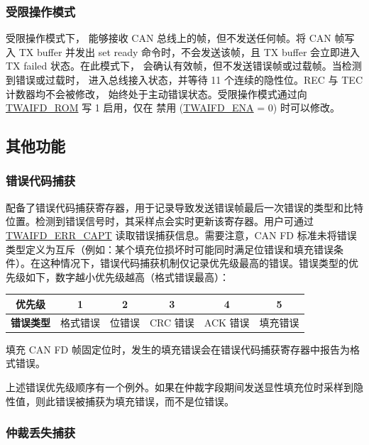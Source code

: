 \documentclass[main\_\_CN.tex]{subfiles}
\begin{document}
\subsubsection{受限操作模式}

受限操作模式下，\modulename{} 能够接收 CAN 总线上的帧，但不发送任何帧。将 CAN 帧写入 TX buffer 并发出 set ready 命令时，不会发送该帧，且 TX buffer 会立即进入 TX failed 状态。在此模式下，\modulename{} 会确认有效帧，但不发送错误帧或过载帧。当检测到错误或过载时，\modulename{} 进入总线接入状态，并等待 11 个连续的隐性位。REC 与 TEC 计数器均不会被修改，\modulename{} 始终处于主动错误状态。受限操作模式通过向 \hyperref[fielddesc:TWAIFDROM]{TWAIFD\_ROM} 写 1 启用，仅在 \modulename{} 禁用 (\hyperref[fielddesc:TWAIFDENA]{TWAIFD\_ENA} = 0) 时可以修改。


\subsection{其他功能}

\subsubsection{错误代码捕获}

\modulename{} 配备了错误代码捕获寄存器，用于记录导致发送错误帧最后一次错误的类型和比特位置。检测到错误信号时，其采样点会实时更新该寄存器。用户可通过 \hyperref[regdesc:TWAIFDERRCAPTRETRCTRALCTSINFOREG]{TWAIFD\_ERR\_CAPT} 读取错误捕获信息。需要注意，CAN FD 标准未将错误类型定义为互斥（例如：某个填充位损坏时可能同时满足位错误和填充错误条件）。在这种情况下，错误代码捕获机制仅记录优先级最高的错误。错误类型的优先级如下，数字越小优先级越高（格式错误最高）：

\begin{center}
\begin{tabular}{|c|c|c|c|c|c|}
\hline
\textbf{优先级} \cellcolor{lightgray} & 1 & 2 & 3 & 4 & 5\tabularnewline
\hline
\textbf{错误类型} \cellcolor{lightgray} & 格式错误 & 位错误 & CRC 错误 & ACK 错误 & 填充错误\tabularnewline
\hline
\end{tabular}
\par\end{center}

填充 CAN FD 帧固定位时，发生的填充错误会在错误代码捕获寄存器中报告为格式错误。

上述错误优先级顺序有一个例外。如果在仲裁字段期间发送显性填充位时采样到隐性值，则此错误被捕获为填充错误，而不是位错误。


\subsubsection{仲裁丢失捕获}
\end{document}
